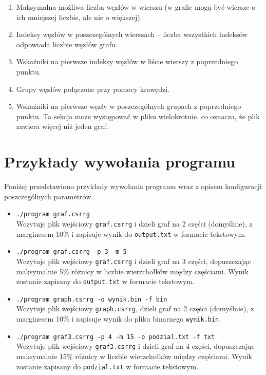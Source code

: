 \documentclass{article}
\begin{document}
\begin{enumerate}
    \item Maksymalna możliwa liczba węzłów w wierszu (w grafie mogą być wiersze o ich mniejszej liczbie, ale nie o większej).
    \item Indeksy węzłów w poszczególnych wierszach – liczba wszystkich indeksów odpowiada liczbie węzłów grafu.
    \item Wskaźniki na pierwsze indeksy węzłów w liście wierszy z poprzedniego punktu.
    \item Grupy węzłów połączone przy pomocy krawędzi.
    \item Wskaźniki na pierwsze węzły w poszczególnych grupach z poprzedniego punktu. Ta sekcja może występować w pliku wielokrotnie, co oznacza, że plik zawiera więcej niż jeden graf.
\end{enumerate}




\section{Przykłady wywołania programu}

Poniżej przedstawiono przykłady wywołania programu wraz z opisem konfiguracji poszczególnych parametrów.

\begin{itemize}
    \item \texttt{./program graf.csrrg} \\
    Wczytuje plik wejściowy \texttt{graf.csrrg} i dzieli graf na 2 części (domyślnie), z marginesem 10\% i zapisuje wynik do \texttt{output.txt} w formacie tekstowym.
    
    \item \texttt{./program graf.csrrg -p 3 -m 5} \\
    Wczytuje plik wejściowy \texttt{graf.csrrg} i dzieli graf na 3 części, dopuszczając maksymalnie 5\% różnicy w liczbie wierzchołków między częściami. Wynik zostanie zapisany do \texttt{output.txt} w formacie tekstowym.
    
    \item \texttt{./program graph.csrrg -o wynik.bin -f bin} \\
    Wczytuje plik wejściowy \texttt{graph.csrrg}, dzieli graf na 2 części (domyślnie), z marginesem 10\% i zapisuje wynik do pliku binarnego \texttt{wynik.bin}.
    
    \item \texttt{./program graf3.csrrg -p 4 -m 15 -o podzial.txt -f txt} \\
    Wczytuje plik wejściowy \texttt{graf3.csrrg} i dzieli graf na 4 części, dopuszczając maksymalnie 15\% różnicy w liczbie wierzchołków między częściami. Wynik zostanie zapisany do \texttt{podzial.txt} w formacie tekstowym.
\end{itemize}
\end{document}

